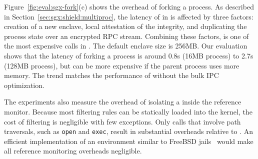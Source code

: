 











Figure~\ref{fig:eval:sgx-fork}(c) shows the overhead of forking a process.
As described in Section~\ref{sec:sgx:shield:multiproc}, the latency of  in \graphenesgx{} is affected by three factors:
creation of a new enclave, local attestation of the integrity, and duplicating the process state over an encrypted RPC stream.
Combining these factors,  is one of the most expensive calls in \graphenesgx{}.
The default enclave size is 256MB.
Our evaluation shows that the latency of forking a process is around 0.8s (16MB process) to 2.7s (128MB process), but can be more expensive if the parent process uses more memory.
The trend matches the performance of \graphene{} without the bulk IPC optimization.









The experiments also measure the overhead of isolating a \graphene{} \picoproc{} inside the reference monitor.
Because most filtering rules can be statically loaded into the kernel,
the cost of filtering is negligible with few exceptions.
Only calls that
involve path traversals, such as {\tt open} and {\tt exec}, result in substantial overheads relative to \graphene{}.
An efficient implementation of an environment similar to FreeBSD  jails~\cite{jails}
would make all reference monitoring overheads negligible.




